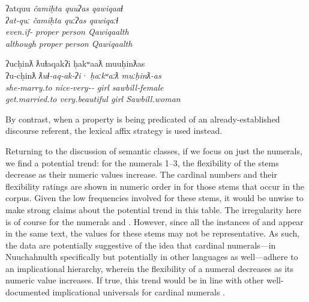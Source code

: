 \begin{exe}
  \ex\label{ex:4.2}
  \begin{xlist}

    \ex\label{ex:4.2a}
    \gllll ʔatquu              \em{čamiḥta} quuʔas qawiqaaɬ\\
           ʔat‑quː             \em{čamiḥta} quːʔas qawiqaːɬ\\
           even.if‑ \em{proper}  person Qawiqaalth\\
           although            \em{proper}  person Qawiqaalth\\

    \ex\label{ex:4.2b}
    \gllll ʔucḥinƛ        ƛuɬaqakʔi                      ḥakʷaaƛ  muuḥinƛas\\
           ʔu‑cḥinƛ       \em{ƛuɬ}‑aq‑ak‑ʔi·               ḥaːkʷaːƛ muːḥinƛ‑as\\
           she‑marry.to   \em{nice}‑very‑‑ girl     sawbill‑female\\
           get.married.to very.beautiful                 girl     Sawbill.woman\\

  \end{xlist}
\end{exe}

\noindent By contrast, when a property is being predicated of an already-established discourse referent, the lexical affix strategy is used instead.

Returning to the discussion of semantic classes, if we focus on just the numerals, we find a potential trend: for the numerals 1–3, the flexibility of the stems decrease as their numeric values increase. The cardinal numbers and their flexibility ratings are shown in numeric order in  for those stems that occur in the corpus. Given the low frequencies involved for these stems, it would be unwise to make strong claims about the potential trend in this table. The irregularity here is of course for the numerals  and . However, since all the instances of  and  appear in the same text, the values for these stems may not be representative. As such, the data are potentially suggestive of the idea that cardinal numerals—in Nuuchahnulth specifically but potentially in other languages as well—adhere to an implicational hierarchy, wherein the flexibility of a numeral decreases as its numeric value increases. If true, this trend would be in line with other well-documented implicational universals for cardinal numerals \parencites{DehaeneMehler1992}[141]{Croft2003}.

